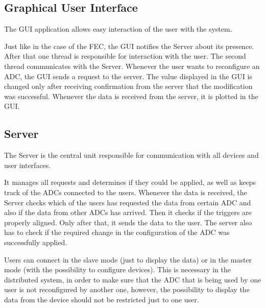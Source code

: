 \documentclass[conference]{IEEEtran}
\begin{document}
\subsection{Graphical User Interface}
The GUI application allows easy interaction of the user with the system.

Just like in the case of the FEC, the GUI notifies the Server about its presence. After that one thread is responsible for interaction with the user. The second thread communicates with the Server. Whenever the user wants to reconfigure an ADC, the GUI sends a request to the server. The value displayed in the GUI is changed only after receiving confirmation from the server that the modification was successful. Whenever the data is received from the server, it is plotted in the GUI. 

\subsection{Server}
The Server is the central unit responsible for communication with all devices and user interfaces.

It manages all requests and determines if they could be applied, as well as keeps track of the ADCs connected to the users. Whenever the data is received, the Server checks which of the users has requested the data from certain ADC and also if the data from other ADCs has arrived. Then it checks if the triggers are properly aligned. Only after that, it sends the data to the user. The server also has to check if the required change in the configuration of the ADC was successfully applied. 

Users can connect in the slave mode (just to display the data) or in the master mode (with the possibility to configure devices). This is necessary in the distributed system, in order to make sure that the ADC that is being used by one user is not reconfigured by another one, however, the possibility to display the data from the device should not be restricted just to one user. 
\end{document}
